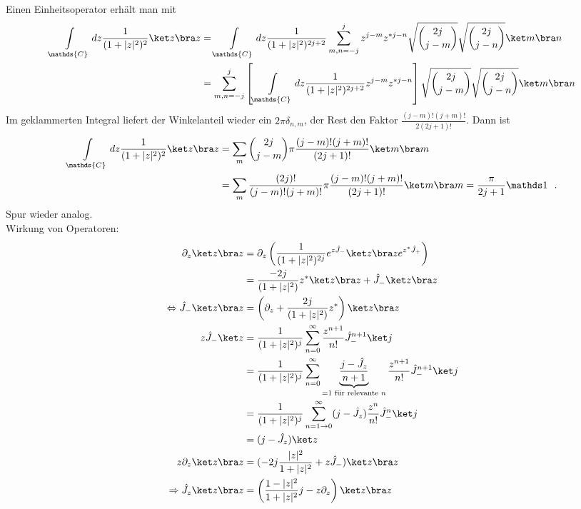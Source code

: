 Einen Einheitsoperator erhält man mit
\begin{align*}
  \int\limits_\mathds{C} dz \frac{1}{(1+|z|^2)^2} \ket z \bra z &= \int\limits_\mathds{C} dz \frac{1}{(1+|z|^2)^{2j+2}} \sum\limits_{m,n =-j}^{j} z^{j-m} z^{*j-n}  \sqrt{\binom{2j}{j-m}}\sqrt{\binom{2j}{j-n}}  \ket m \bra n\\
  &=  \sum\limits_{m,n =-j}^{j} \left[ \int\limits_\mathds{C} dz \frac{1}{(1+|z|^2)^{2j+2}}  z^{j-m} z^{*j-n}\right]   \sqrt{\binom{2j}{j-m}}\sqrt{\binom{2j}{j-n}}  \ket m \bra n 
\end{align*}
Im geklammerten Integral liefert der Winkelanteil wieder ein $2\pi\delta_{n,m}$, der Rest den Faktor $\frac{(j-m)!(j+m)!}{2(2j+1)!}$.
Dann ist
\begin{align*}
  \int\limits_\mathds{C} dz \frac{1}{(1+|z|^2)^2} \ket z \bra z &= \sum\limits_m \binom {2j}{j-m} \pi \frac{(j-m)!(j+m)!}{(2j+1)!}  \ket m \bra m\\
 &= \sum\limits_m \frac{(2j)!}{(j-m)!(j+m)!} \pi \frac{(j-m)!(j+m)!}{(2j+1)!}  \ket m \bra m = \frac{\pi}{2j+1} \mathds 1 ~~.
\end{align*}
Spur wieder analog.\\
Wirkung von Operatoren:
\begin{align*}
  \partial_z \ket z \bra z &= \partial_z\left( \frac{1}{(1+|z|^2)^{2j}} e^{z\hat J_-} \ket z \bra z e^{z^*\hat J_+} \right)\\
  &= \frac{-2j}{(1+|z|^2)} z^* \ket z \bra z + \hat J_-\ket z \bra z\\
  \Leftrightarrow \hat J_-\ket z \bra z &= \left( \partial_z + \frac{2j}{(1+|z|^2)} z^*\right) \ket z \bra z\\
  z\hat J_- \ket z &= \frac{1}{(1+|z|^2)^{j}} \sum\limits_{n=0}^{\infty} \frac{z^{n+1}}{n!}\hat J_-^{n+1}\ket j \\
  &= \frac{1}{(1+|z|^2)^{j}} \sum\limits_{n=0}^{\infty} \underbrace{\frac{j-\hat J_z}{n+1}}_{ = 1\text{ für relevante }n} \frac{z^{n+1}}{n!} \hat J_-^{n+1}\ket j \\
  &=  \frac{1}{(1+|z|^2)^{j}} \sum\limits_{n=1 \rightarrow 0}^{\infty} (j-\hat J_z)\frac{z^{n}}{n!} \hat J_-^{n}\ket j \\
  &= (j-\hat J_z)\ket  z\\  
  z\partial_z\ket z \bra z &= (-2j \frac{|z|^2}{1+|z|^2} + z \hat J_-)\ket z \bra z\\
\Rightarrow \hat J_z\ket z \bra z &= \left( \frac{1-|z|^2}{1+|z|^2} j - z\partial_z \right)\ket z \bra z
\end{align*}
